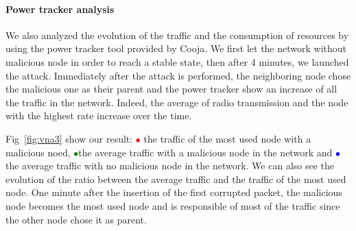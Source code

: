 \documentclass[11pt]{report}
\begin{document}
\paragraph{Power tracker analysis}
We also analyzed the evolution of the traffic and the consumption of
resources by using the power tracker tool provided by Cooja. We first
let the network without malicious node in order to reach a stable state,
then after 4 minutes, we launched the attack. Immediately after the
attack is performed, the neighboring node chose the malicious one as
their parent and the power tracker show an increase of all the traffic
in the network. Indeed, the average of radio transmission and the node
with the highest rate increase over the time. 

Fig~\ref{fig:vna3} show our result: 
\textcolor{red}{$\bullet$} the traffic of the most used node with a malicious noed,
\textcolor{green}{$\bullet$}the average traffic with
a malicious node in the network and \textcolor{blue}{$\bullet$} the average traffic
with no malicious node in the network. We can also see the evolution of
the ratio between the average traffic and the traffic of the most used
node. One minute after the insertion of the first corrupted packet, the
malicious node becomes the most used node and is responsible of most of
the traffic since the other node chose it as parent. 
\end{document}

